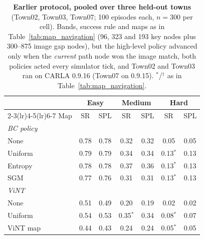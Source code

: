 \begin{table}[H]
\centering
\footnotesize
\setlength{\tabcolsep}{3.5pt}
\caption{\textbf{Earlier protocol, pooled over three held-out towns} (Town02, Town03, Town07; 100 episodes each, $n{=}300$ per cell). Bands, success rule and maps as in Table~\ref{tab:map_navigation} (96, 323 and 193 key nodes plus 300--875 image gap nodes), but the high-level policy advanced only when the \emph{current} path node won the image match, both policies acted every simulator tick, and Town02 and Town03 ran on CARLA 0.9.16 (Town07 on 0.9.15). $^{*}$/$^{\dagger}$ as in Table~\ref{tab:map_navigation}.}
\label{tab:map_navigation_orignav}
\begin{tabular}{lcccccc}
\toprule
 & \multicolumn{2}{c}{Easy} & \multicolumn{2}{c}{Medium} & \multicolumn{2}{c}{Hard} \\
\cmidrule(lr){2-3}\cmidrule(lr){4-5}\cmidrule(lr){6-7}
Map & SR & SPL & SR & SPL & SR & SPL \\
\midrule
\multicolumn{7}{l}{\textit{BC policy}} \\
None & 0.78 & 0.78 & 0.32 & 0.32 & 0.05 & 0.05 \\
Uniform & 0.79 & 0.79 & 0.34 & 0.34 & 0.13$^{*}$ & 0.13 \\
Entropy & 0.78 & 0.78 & 0.37 & 0.36 & 0.13$^{*}$ & 0.13 \\
SGM & 0.77 & 0.76 & 0.31 & 0.31 & 0.13$^{*}$ & 0.13 \\
\midrule
\multicolumn{7}{l}{\textit{ViNT}~\cite{shah2023vint}} \\
None & 0.51 & 0.49 & 0.20 & 0.19 & 0.02 & 0.02 \\
Uniform & 0.54 & 0.53 & 0.35$^{*}$ & 0.34 & 0.08$^{*}$ & 0.07 \\
ViNT map & 0.44 & 0.43 & 0.24 & 0.24 & 0.05$^{*}$ & 0.05 \\
\bottomrule
\end{tabular}
\end{table}

